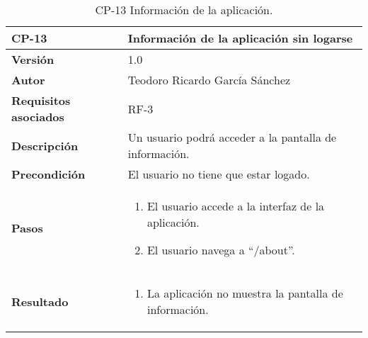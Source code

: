 \begin{table}[p]
	\centering
	\begin{tabularx}{\linewidth}{ p{} p{} }
		\toprule
		\textbf{CP-13}    & \textbf{Información de la aplicación sin logarse}\\
		\toprule
		\textbf{Versión}              & 1.0    \\
		\textbf{Autor}                & Teodoro Ricardo García Sánchez \\
		\textbf{Requisitos asociados} & RF-3 \\
		\textbf{Descripción}          & Un usuario podrá acceder a la pantalla de información. \\
		\textbf{Precondición}         & El usuario no tiene que estar logado. \\
		\textbf{Pasos}             &
		\begin{enumerate}
			\def\labelenumi{\arabic{enumi}.}
			\tightlist
			\item El usuario accede a la interfaz de la aplicación.
			\item El usuario navega a ``/about''.
		\end{enumerate}\\
		\textbf{Resultado}          & 
		\begin{enumerate}
			\item La aplicación no muestra la pantalla de información.
		\end{enumerate}\\
		\bottomrule
	\end{tabularx}
	\caption{CP-13 Información de la aplicación.}
\end{table}

